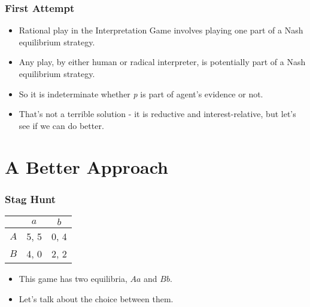 \begin{frame}

\frametitle{First Attempt}
\label{firstattempt}

\begin{itemize}
\item Rational play in the Interpretation Game involves playing one part of a Nash equilibrium strategy.

\item Any play, by either human or radical interpreter, is potentially part of a Nash equilibrium strategy.

\item So it is indeterminate whether \emph{p} is part of agent's evidence or not.

\item That's not a terrible solution - it is reductive and interest-relative, but let's see if we can do better.

\end{itemize}

\end{frame}

\section{A Better Approach}
\label{abetterapproach}

\begin{frame}

\frametitle{Stag Hunt}
\label{staghunt}


\begin{center}
\begin{tabular}{r | c c}
& $a$ & $b$  \\\hline
$A$ & 5, 5 & 0, 4 \\
$B$ & 4, 0 & 2, 2
\end{tabular}
\end{center}


\begin{itemize}
\item This game has two equilibria, $Aa$ and $Bb$.

\item Let's talk about the choice between them.

\end{itemize}

\end{frame}

